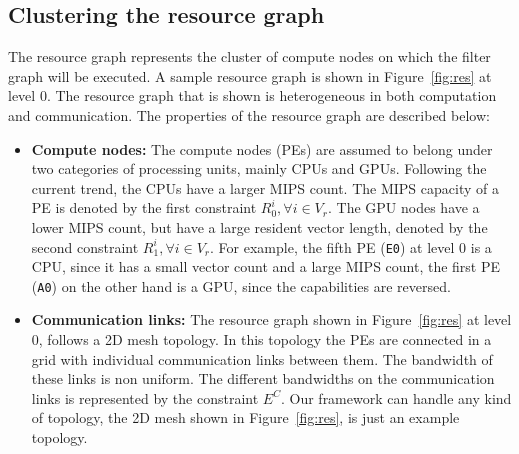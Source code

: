 \subsection{Clustering the resource graph}
\label{sec:gener-reso-graph}

The resource graph represents the cluster of compute nodes on which the
filter graph will be executed. %
A sample resource graph is shown in Figure~\ref{fig:res} at level 0. The
resource graph that is shown is heterogeneous in both computation and
communication. The properties of the resource graph are described below:

\begin{itemize}

\item \textbf{Compute nodes:} The compute nodes (PEs) are assumed to
  belong under two categories of processing units, mainly CPUs and
  GPUs. Following the current trend, the CPUs have a larger MIPS
  count. The MIPS capacity of a PE is denoted by the first constraint
  $R^i_0, \forall i \in V_r$. The GPU nodes have a lower MIPS count, but
  have a large resident vector length, denoted by the second constraint
  $R^i_1, \forall i \in V_r$. For example, the fifth PE (\texttt{E0}) at
  level 0 is a CPU, since it has a small vector count and a large MIPS
  count, the first PE (\texttt{A0}) on the other hand is a GPU, since
  the capabilities are reversed.


\item \textbf{Communication links:} The resource graph shown in
  Figure~\ref{fig:res} at level 0, follows a 2D mesh topology. In this
  topology the PEs are connected in a grid with individual communication
  links between them. The bandwidth of these links is non uniform. The
  different bandwidths on the communication links is represented by the
  constraint $E^C$. Our framework can handle any kind of topology, the
  2D mesh shown in Figure~\ref{fig:res}, is just an example topology.

\end{itemize}

